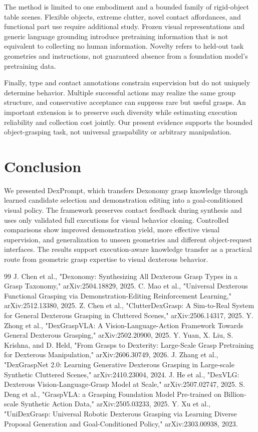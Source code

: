 \documentclass[letterpaper,10pt,conference]{ieeeconf}
\begin{document}
The method is limited to one embodiment and a bounded family of rigid-object table scenes. Flexible objects, extreme clutter, novel contact affordances, and functional part use require additional study. Frozen visual representations and generic language grounding introduce pretraining information that is not equivalent to collecting no human information. Novelty refers to held-out task geometries and instructions, not guaranteed absence from a foundation model's pretraining data.

Finally, type and contact annotations constrain supervision but do not uniquely determine behavior. Multiple successful actions may realize the same group structure, and conservative acceptance can suppress rare but useful grasps. An important extension is to preserve such diversity while estimating execution reliability and collection cost jointly. Our present evidence supports the bounded object-grasping task, not universal graspability or arbitrary manipulation.

\section{Conclusion}
We presented DexPrompt, which transfers Dexonomy grasp knowledge through learned candidate selection and demonstration editing into a goal-conditioned visual policy. The framework preserves contact feedback during synthesis and uses only validated full executions for visual behavior cloning. Controlled comparisons show improved demonstration yield, more effective visual supervision, and generalization to unseen geometries and different object-request interfaces. The results support execution-aware knowledge transfer as a practical route from geometric grasp expertise to visual dexterous behavior.

\begin{thebibliography}{99}
 J. Chen et al., "Dexonomy: Synthesizing All Dexterous Grasp Types in a Grasp Taxonomy," arXiv:2504.18829, 2025.
 C. Mao et al., "Universal Dexterous Functional Grasping via Demonstration-Editing Reinforcement Learning," arXiv:2512.13380, 2025.
 Z. Chen et al., "ClutterDexGrasp: A Sim-to-Real System for General Dexterous Grasping in Cluttered Scenes," arXiv:2506.14317, 2025.
 Y. Zhong et al., "DexGraspVLA: A Vision-Language-Action Framework Towards General Dexterous Grasping," arXiv:2502.20900, 2025.
 Y. Yuan, X. Liu, S. Krishna, and D. Held, "From Grasps to Dexterity: Large-Scale Grasp Pretraining for Dexterous Manipulation," arXiv:2606.30749, 2026.
 J. Zhang et al., "DexGraspNet 2.0: Learning Generative Dexterous Grasping in Large-scale Synthetic Cluttered Scenes," arXiv:2410.23004, 2024.
 J. He et al., "DexVLG: Dexterous Vision-Language-Grasp Model at Scale," arXiv:2507.02747, 2025.
 S. Deng et al., "GraspVLA: a Grasping Foundation Model Pre-trained on Billion-scale Synthetic Action Data," arXiv:2505.03233, 2025.
 Y. Xu et al., "UniDexGrasp: Universal Robotic Dexterous Grasping via Learning Diverse Proposal Generation and Goal-Conditioned Policy," arXiv:2303.00938, 2023.
\end{thebibliography}
\end{document}
